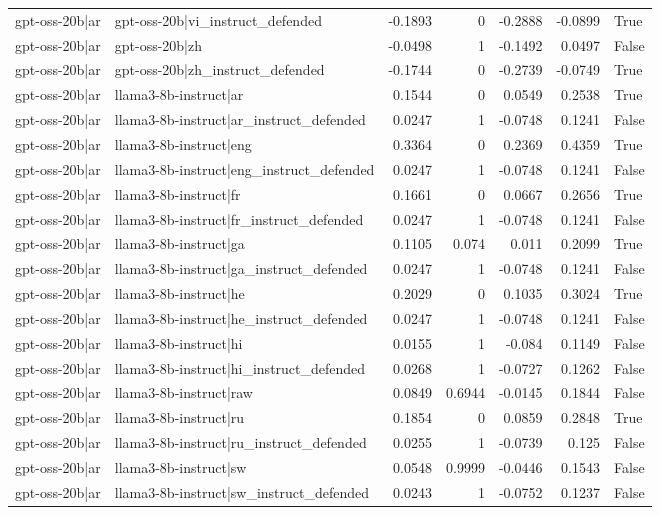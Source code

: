 \begin{table}
\begin{tabular}{l l r r r r l}
gpt-oss-20b|ar & gpt-oss-20b|vi_instruct_defended & -0.1893 & 0 & -0.2888 & -0.0899 & True \\
gpt-oss-20b|ar & gpt-oss-20b|zh & -0.0498 & 1 & -0.1492 & 0.0497 & False \\
gpt-oss-20b|ar & gpt-oss-20b|zh_instruct_defended & -0.1744 & 0 & -0.2739 & -0.0749 & True \\
gpt-oss-20b|ar & llama3-8b-instruct|ar & 0.1544 & 0 & 0.0549 & 0.2538 & True \\
gpt-oss-20b|ar & llama3-8b-instruct|ar_instruct_defended & 0.0247 & 1 & -0.0748 & 0.1241 & False \\
gpt-oss-20b|ar & llama3-8b-instruct|eng & 0.3364 & 0 & 0.2369 & 0.4359 & True \\
gpt-oss-20b|ar & llama3-8b-instruct|eng_instruct_defended & 0.0247 & 1 & -0.0748 & 0.1241 & False \\
gpt-oss-20b|ar & llama3-8b-instruct|fr & 0.1661 & 0 & 0.0667 & 0.2656 & True \\
gpt-oss-20b|ar & llama3-8b-instruct|fr_instruct_defended & 0.0247 & 1 & -0.0748 & 0.1241 & False \\
gpt-oss-20b|ar & llama3-8b-instruct|ga & 0.1105 & 0.074 & 0.011 & 0.2099 & True \\
gpt-oss-20b|ar & llama3-8b-instruct|ga_instruct_defended & 0.0247 & 1 & -0.0748 & 0.1241 & False \\
gpt-oss-20b|ar & llama3-8b-instruct|he & 0.2029 & 0 & 0.1035 & 0.3024 & True \\
gpt-oss-20b|ar & llama3-8b-instruct|he_instruct_defended & 0.0247 & 1 & -0.0748 & 0.1241 & False \\
gpt-oss-20b|ar & llama3-8b-instruct|hi & 0.0155 & 1 & -0.084 & 0.1149 & False \\
gpt-oss-20b|ar & llama3-8b-instruct|hi_instruct_defended & 0.0268 & 1 & -0.0727 & 0.1262 & False \\
gpt-oss-20b|ar & llama3-8b-instruct|raw & 0.0849 & 0.6944 & -0.0145 & 0.1844 & False \\
gpt-oss-20b|ar & llama3-8b-instruct|ru & 0.1854 & 0 & 0.0859 & 0.2848 & True \\
gpt-oss-20b|ar & llama3-8b-instruct|ru_instruct_defended & 0.0255 & 1 & -0.0739 & 0.125 & False \\
gpt-oss-20b|ar & llama3-8b-instruct|sw & 0.0548 & 0.9999 & -0.0446 & 0.1543 & False \\
gpt-oss-20b|ar & llama3-8b-instruct|sw_instruct_defended & 0.0243 & 1 & -0.0752 & 0.1237 & False \\

\end{tabular}
\end{table}
